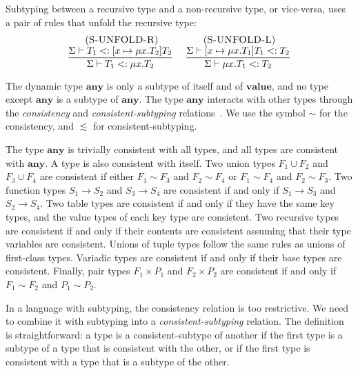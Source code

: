 \documentclass{sigplanconf}
\newcommand{\Value}{\mathbf{value}}
\newcommand{\Any}{\mathbf{any}}
\newcommand{\mylabel}[1]{\; (\textsc{#1})}
\newcommand{\senv}{\Sigma}
\newcommand{\subtype}{<:}
\begin{document}
Subtyping between a recursive type and a non-recursive type, or
vice-versa, uses a pair of rules that unfold the recursive type:
\[
\begin{array}{c}
\begin{array}{c}
\mylabel{S-UNFOLD-R}\\
\dfrac{\senv \vdash T_{1} \subtype [x \mapsto \mu x.T_{2}]T_{2}}
      {\senv \vdash T_{1} \subtype \mu x.T_{2}}
\end{array}
\;
\begin{array}{c}
\mylabel{S-UNFOLD-L}\\
\dfrac{\senv \vdash [x \mapsto \mu x.T_{1}]T_{1} \subtype T_{2}}
      {\senv \vdash \mu x.T_{1} \subtype T_{2}}
\end{array}
\end{array}
\]

The dynamic type $\Any$ is only a subtype of itself and of
$\Value$, and no type except $\Any$ is a subtype of $\Any$.
The type $\Any$ interacts with other types through the
{\em consistency} and {\em consistent-subtyping} 
relations~\cite{siek2007objects}. We use the symbol $\sim$ for
the consistency, and $\lesssim$ for consistent-subtyping.

The type $\Any$ is trivially consistent with all types, and all types
are consistent with $\Any$. A type is also consistent with
itself. Two union types $F_1 \cup F_2$ and $F_3 \cup F_4$ are
consistent if either $F_1 \sim F_3$ and $F_2 \sim F_4$ or
$F_1 \sim F_4$ and $F_2 \sim F_3$. Two function types
$S_1 \rightarrow S_2$ and $S_3 \rightarrow S_4$ are consistent
if and only if $S_1 \rightarrow S_3$ and $S_2 \rightarrow S_4$. Two table types are consistent if and only if they have the same key types, and the value types of each key type are consistent. Two recursive types are consistent if and only if their contents are consistent assuming that their type variables are consistent. Unions of tuple types follow the same rules as unions of first-class types. Variadic types are consistent if and only if their base types are consistent. 
Finally, pair types $F_1 \times P_1$ and $F_2 \times P_2$ are
consistent if and only if $F_1 \sim F_2$ and $P_1 \sim P_2$.

In a language with subtyping, the consistency relation is
too restrictive. We need to combine it with subtyping into a
{\em consistent-subtyping} relation. The definition is
straightforward: a type is a consistent-subtype
of another if the first type is a subtype of a type
that is consistent with the other, or if the first type
is consistent with a type that is a subtype of the other.
\end{document}
